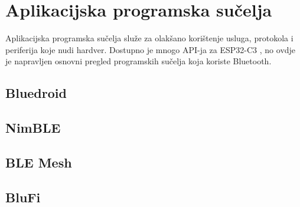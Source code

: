 \chapter{Aplikacijska programska sučelja}

Aplikacijska programska sučelja služe za olakšano korištenje usluga, protokola i periferija koje nudi hardver. Dostupno je mnogo API-ja za ESP32-C3 \cite{espressif}, no ovdje je napravljen osnovni pregled programskih sučelja koja koriste Bluetooth. 

\section{Bluedroid}

\section{NimBLE}

\section{BLE Mesh}

\section{BluFi}

\eject